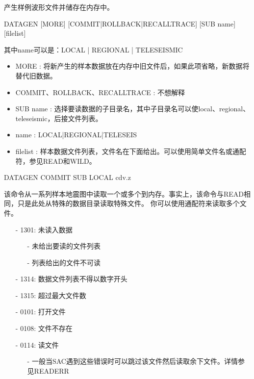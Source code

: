 \label{cmd:datagen}

产生样例波形文件并储存在内存中。

DATAGEN [MORE] [COMMIT|ROLLBACK|RECALLTRACE] [SUB name] [filelist]

其中name可以是：LOCAL | REGIONAL | TELESEISMIC

\begin{itemize}
\item MORE : 将新产生的样本数据放在内存中旧文件后，如果此项省略，新数据将替代旧数据。
\item COMMIT、ROLLBACK、RECALLTRACE : 不想解释
\item SUB name : 选择要读数据的子目录名，其中子目录名可以使local、regional、teleseismic，后接文件列表。
\item name : LOCAL|REGIONAL|TELESEIS
\item filelist : 样本数据文件列表，文件名在下面给出。可以使用简单文件名或通配符，参见READ和WILD。
\end{itemize}

DATAGEN COMMIT SUB LOCAL cdv.z

该命令从一系列样本地震图中读取一个或多个到内存。事实上，该命令与READ相同，只是此处从特殊的数据目录读取特殊文件。
你可以使用通配符来读取多个文件。

\begin{itemize}
\item[-]1301: 未读入数据
	\begin{itemize}
  	\item[-]未给出要读的文件列表
	\item[-] 列表给出的文件不可读
	\end{itemize}
\item[-]1314: 数据文件列表不得以数字开头
\item[-]1315: 超过最大文件数
\end{itemize}

\begin{itemize}
\item[-]0101: 打开文件
\item[-]0108: 文件不存在
\item[-]0114: 读文件
	\begin{itemize}
	\item[-]一般当SAC遇到这些错误时可以跳过该文件然后读取余下文件。详情参见READERR
	\end{itemize}
\end{itemize}
  
